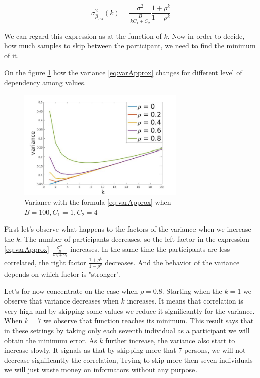 \documentclass[12pt]{report}
\begin{document}
\begin{equation}
\label{eq:varApprox}
 \sigma^2_{\hat{\mu}_{SA}} (k) = \frac{\sigma^2}{\frac{B}{kC_1 + C_2}} \frac{1+\rho^k}{1-\rho^k}
\end{equation}

We can regard this expression as at the function of $k$. Now in order to decide, how much samples to skip between the participant, we need to find the minimum of it.


On the figure \ref{fig:varPredDifRho} how the variance \ref{eq:varApprox} changes for different level of dependency among values.


\begin{figure}[ht]
    \centering
    \includegraphics[height=200px]{varPredDifRho}
    \caption{Variance with the formula \ref{eq:varApprox} when $B = 100, C_1 = 1, C_2 = 4$}
    \label{fig:varPredDifRho}
\end{figure}

First let's observe what happens to the factors of the variance when we increase the $k$. The number of participants decreases, so the left factor in the expression \ref{eq:varApprox} $\frac{\sigma^2}{\frac{B}{kC_1 + C_2}}$ increases. In the same time the participants are less correlated, the right factor  $\frac{1+\rho^k}{1-\rho^k}$ decreases. And the behavior of the variance depends on which factor is "stronger".

Let's for now concentrate on the case when $\rho = 0.8$. Starting when the $k = 1$ we observe that variance decreases when $k$ increases. It means that correlation is very high and by skipping some values we reduce it significantly for the variance. When $k = 7$ we observe that function reaches its minimum. This result says that in these settings by taking only each seventh individual as a participant we will obtain the minimum error.  As $k$ further increase, the variance also start to increase slowly. It signals as that by skipping more that 7 persons, we will not decrease significantly the correlation, Trying to skip more then seven individuals we will just waste money on informators without any purpose.
\end{document}
